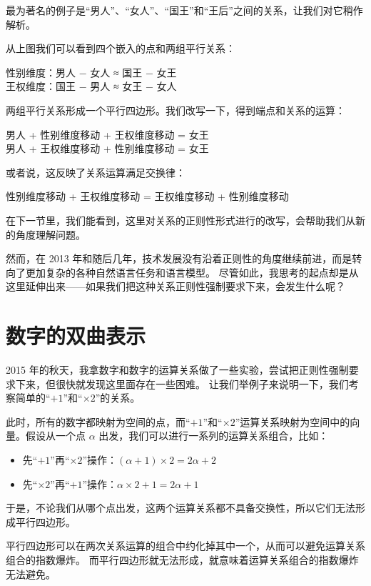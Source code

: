\documentclass[a4paper,12pt]{book}
\numberwithin{problem}{section}
\numberwithin{definition}{section}
\numberwithin{lemma}{section}
\numberwithin{proposition}{section}
\numberwithin{theorem}{section}
\numberwithin{grammar}{section}
\numberwithin{program}{section}
\numberwithin{convention}{section}
\numberwithin{corollary}{section}
\begin{document}
最为著名的例子是“男人”、“女人”、“国王”和“王后”之间的关系，让我们对它稍作解析。

从上图我们可以看到四个嵌入的点和两组平行关系：

\colorbox{red!10}{
性别维度：男人 $-$ 女人 ≈ 国王  $-$ 女王
}
\\
\colorbox{blue!10}{
王权维度：国王 $-$ 男人 ≈ 女王  $-$ 女人
}

两组平行关系形成一个平行四边形。我们改写一下，得到端点和关系的运算：

\colorbox{yellow!10}{男人 + 性别维度移动 + 王权维度移动 = 女王}
\\
\colorbox{yellow!10}{男人 + 王权维度移动 + 性别维度移动 = 女王}

或者说，这反映了关系运算满足交换律：

\colorbox{yellow!10}{性别维度移动 + 王权维度移动 = 王权维度移动 + 性别维度移动}

在下一节里，我们能看到，这里对关系的正则性形式进行的改写，会帮助我们从新的角度理解问题。

然而，在 2013 年和随后几年，技术发展没有沿着正则性的角度继续前进，而是转向了更加复杂的各种自然语言任务和语言模型。
尽管如此，我思考的起点却是从这里延伸出来——如果我们把这种关系正则性强制要求下来，会发生什么呢？

\section{数字的双曲表示}

2015 年的秋天，我拿数字和数字的运算关系做了一些实验，尝试把正则性强制要求下来，但很快就发现这里面存在一些困难。
让我们举例子来说明一下，我们考察简单的“$+1$”和“$\times 2$”的关系。

此时，所有的数字都映射为空间的点，而“$+1$”和“$\times 2$”运算关系映射为空间中的向量。假设从一个点 $\alpha$ 出发，我们可以进行一系列的运算关系组合，比如：
\begin{itemize}
\item 先“$+1$”再“$\times 2$”操作：$(\alpha +1) \times 2 = 2 \alpha + 2$
\item 先“$\times 2$”再“$+1$”操作：$\alpha \times 2 + 1 = 2 \alpha + 1$
\end{itemize}

于是，不论我们从哪个点出发，这两个运算关系都不具备交换性，所以它们无法形成平行四边形。

平行四边形可以在两次关系运算的组合中约化掉其中一个，从而可以避免运算关系组合的指数爆炸。
而平行四边形就无法形成，就意味着运算关系组合的指数爆炸无法避免。
\end{document}
